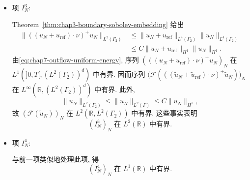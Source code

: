 \begin{sloppypar}
\begin{Proof}
\begin{itemize}
利用 H\"older 不等式和精确 Sobolev 不等式 (Proposition~\ref{prop:chap3-gagliardo-nirenberg-interpolation}), 得到
\[
\begin{aligned}
 \|(u_N+u_{\mathrm{ref}})\otimes(u_N+u_{\mathrm{ref}})\|_{L^2}
 &\leq\|u_N+u_{\mathrm{ref}}\|_{L^4}^2\\
 &\leq C\|u_N+u_{\mathrm{ref}}\|_{L^2}^{1/2}
 \|\nabla(u_N+u_{\mathrm{ref}})\|_{L^2}^{3/2}.
\end{aligned}
\]
所以由\eqref{eq:chap7-outflow-uniform-energy}, 序列
$((u_N+u_{\mathrm{ref}})\otimes(u_N+u_{\mathrm{ref}}))_N$
在 $L^{4/3}(]0,T[,(L^2(\Omega))^{d\times d})$ 中有界. 把它在时间区间 $]0,T[$ 外作零延拓, 并再次使用 Hausdorff--Young Theorem, 得序列
$\bigl(\mathcal F((\widetilde u_N+\widetilde u_{\mathrm{ref}})\otimes
(\widetilde u_N+\widetilde u_{\mathrm{ref}}))\bigr)_N$
在 $L^4(\mathbb R,(L^2(\Omega))^{d\times d})$ 中有界. 还由\eqref{eq:chap7-outflow-uniform-energy}推出
$(\nabla\mathcal F(\widetilde u_N))_N$ 在 $L^2(\mathbb R,(L^2(\Omega))^{d\times d})$ 中有界. 合并这两个界, 得
\begin{equation}
 (I_N^2)_N\text{ 在 }L^{4/3}(\mathbb R)\text{ 中有界}.
\label{eq:chap7-fourier-term-two}
\end{equation}

\item 项 $I_N^3$:

Theorem~\ref{thm:chap3-boundary-sobolev-embedding} 给出
\[
\begin{aligned}
 \|((u_N+u_{\mathrm{ref}})\cdot\nu)^+u_N\|_{L^2(\Gamma_2)}
 &\leq\|u_N+u_{\mathrm{ref}}\|_{L^4(\Gamma_2)}
 \|u_N\|_{L^4(\Gamma_2)}\\
 &\leq C\|u_N+u_{\mathrm{ref}}\|_{H^1}\|u_N\|_{H^1}.
\end{aligned}
\]
由\eqref{eq:chap7-outflow-uniform-energy}, 序列
$(((u_N+u_{\mathrm{ref}})\cdot\nu)^+u_N)_N$
在 $L^1(]0,T[,(L^2(\Gamma_2))^d)$ 中有界. 因而序列
$\bigl(\mathcal F(((\widetilde u_N+\widetilde u_{\mathrm{ref}})\cdot\nu)^+
\widetilde u_N)\bigr)_N$ 在 $L^\infty(\mathbb R,(L^2(\Gamma_2))^d)$ 中有界. 此外,
\[
 \|u_N\|_{L^2(\Gamma_2)}\leq\|u_N\|_{L^2(\Gamma)}
 \leq C\|u_N\|_{H^1},
\]
故 $(\mathcal F(\widetilde u_N))_N$ 在 $L^2(\mathbb R,L^2(\Gamma_2))$ 中有界. 这些事实表明
\begin{equation}
 (I_N^3)_N\text{ 在 }L^2(\mathbb R)\text{ 中有界}.
\label{eq:chap7-fourier-term-three}
\end{equation}

\item 项 $I_N^4$:

与前一项类似地处理此项, 得
\begin{equation}
 (I_N^4)_N\text{ 在 }L^1(\mathbb R)\text{ 中有界}.
\label{eq:chap7-fourier-term-four}
\end{equation}


\end{itemize}
\end{Proof}
\end{sloppypar}
